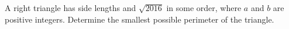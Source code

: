 A right triangle has side lengths   and $\sqrt{2016}$ in some order, where $a$ and $b$ are positive integers. Determine the smallest possible perimeter of the triangle.